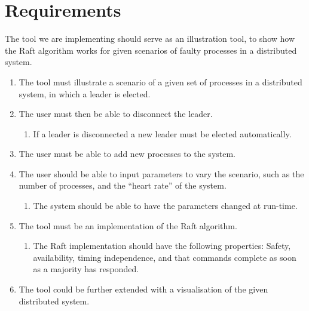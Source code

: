 \section{Requirements}
The tool we are implementing should serve as an illustration tool, to show how the Raft algorithm works for given scenarios of faulty processes in a distributed system.
\begin{enumerate}
\item The tool must illustrate a scenario of a given set of processes in a distributed system, in which a leader is elected.
\item The user must then be able to disconnect the leader.
	\begin{enumerate}
	\item If a leader is disconnected a new leader must be elected automatically.
	\end{enumerate}
\item The user must be able to add new processes to the system.
\item The user should be able to input parameters to vary the scenario, such as the number of processes, and the “heart rate” of the system.
	\begin{enumerate}
	\item The system should be able to have the parameters changed at run-time.
	\end{enumerate}
\item The tool must be an implementation of the Raft algorithm.
	\begin{enumerate}
	\item The Raft implementation should have the following properties: Safety, availability, timing independence, and that commands complete as soon as a majority has responded. 
	\end{enumerate}
\item The tool could be further extended with a visualisation of the given distributed system.
\end{enumerate}

